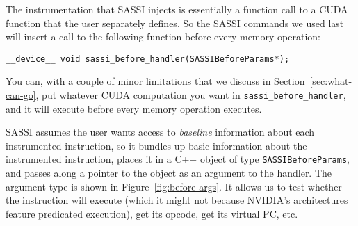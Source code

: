 The instrumentation that SASSI injects is essentially a function call
to a CUDA function that the user separately defines.  So the SASSI
commands we used last will insert a call to the following function
before every memory operation:
\begin{center}
\begin{lstlisting}
__device__ void sassi_before_handler(SASSIBeforeParams*);
\end{lstlisting}
\end{center}

You can, with a couple of minor limitations that we discuss in
Section~\ref{sec:what-can-go},  
put whatever CUDA computation you want in
\texttt{sassi\_before\_handler}, and it will execute before every
memory operation executes.

SASSI assumes the user wants access to
\emph{baseline} information about each instrumented instruction, so it
bundles up basic information about the instrumented instruction,
places it in a C++ object of type \texttt{SASSIBeforeParams}, and
passes along a pointer to the object as an argument to the handler.
The argument type is shown in Figure~\ref{fig:before-args}.  It allows
us to test whether the instruction will execute (which it might not
because NVIDIA's architectures feature predicated execution), get its
opcode, get its virtual PC, etc.

